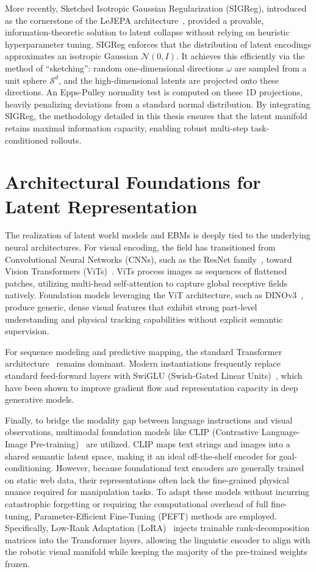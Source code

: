 More recently, Sketched Isotropic Gaussian Regularization (SIGReg), introduced as the cornerstone of the LeJEPA architecture~\cite{lejepa}, provided a provable, information-theoretic solution to latent collapse without relying on heuristic hyperparameter tuning. SIGReg enforces that the distribution of latent encodings approximates an isotropic Gaussian $\mathcal{N}(0, I)$. It achieves this efficiently via the method of ``sketching'': random one-dimensional directions $\omega$ are sampled from a unit sphere $\mathcal{S}^d$, and the high-dimensional latents are projected onto these directions. An Epps-Pulley normality test is computed on these 1D projections, heavily penalizing deviations from a standard normal distribution. By integrating SIGReg, the methodology detailed in this thesis ensures that the latent manifold retains maximal information capacity, enabling robust multi-step task-conditioned rollouts.

\section{Architectural Foundations for Latent Representation}

The realization of latent world models and EBMs is deeply tied to the underlying neural architectures. For visual encoding, the field has transitioned from Convolutional Neural Networks (CNNs), such as the ResNet family~\cite{DBLP:journals/corr/HeZRS15}, toward Vision Transformers (ViTs)~\cite{vit}. ViTs process images as sequences of flattened patches, utilizing multi-head self-attention to capture global receptive fields natively. Foundation models leveraging the ViT architecture, such as DINOv3~\cite{dinov3}, produce generic, dense visual features that exhibit strong part-level understanding and physical tracking capabilities without explicit semantic supervision.

For sequence modeling and predictive mapping, the standard Transformer architecture~\cite{vaswani2017attention} remains dominant. Modern instantiations frequently replace standard feed-forward layers with SwiGLU (Swish-Gated Linear Units)~\cite{swiglu}, which have been shown to improve gradient flow and representation capacity in deep generative models.

Finally, to bridge the modality gap between language instructions and visual observations, multimodal foundation models like CLIP (Contrastive Language-Image Pre-training)~\cite{clip} are utilized. CLIP maps text strings and images into a shared semantic latent space, making it an ideal off-the-shelf encoder for goal-conditioning. However, because foundational text encoders are generally trained on static web data, their representations often lack the fine-grained physical nuance required for manipulation tasks. To adapt these models without incurring catastrophic forgetting or requiring the computational overhead of full fine-tuning, Parameter-Efficient Fine-Tuning (PEFT) methods are employed. Specifically, Low-Rank Adaptation (LoRA)~\cite{hu2022lora} injects trainable rank-decomposition matrices into the Transformer layers, allowing the linguistic encoder to align with the robotic visual manifold while keeping the majority of the pre-trained weights frozen.

